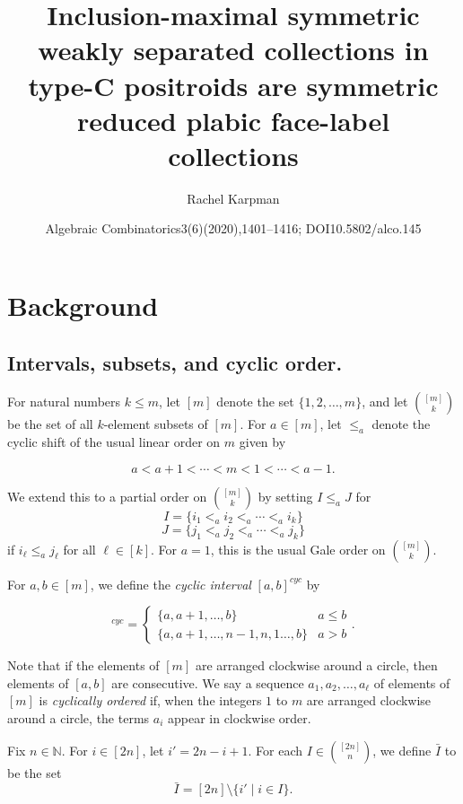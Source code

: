 \documentclass[10pt]{amsart}
\title[Symmetric weak separation and plabic face labels]{Inclusion-maximal symmetric weakly separated collections in type-C positroids are symmetric reduced plabic face-label collections}
\author{Rachel Karpman}
\date{Algebraic Combinatorics3(6)(2020),1401–1416; DOI10.5802/alco.145}
\theoremstyle{definition}
\begin{document}
\maketitle
\setcounter{section}{1}
\section{Background}
\label{back}
\subsection{Intervals, subsets, and cyclic order.}

For natural numbers $k \leq m$, let $[m]$ denote the set $\{1,2,\ldots,m\}$, and let $\binom{[m]}{k}$ be the set of all $k$-element subsets of $[m]$. For $a \in [m]$, let $\leq_a$ denote the cyclic shift of the usual linear order on $m$ given by 
 
\begin{equation}
	a < a + 1 < \cdots < m < 1 < \cdots < a-1.
\end{equation}

We extend this to a partial order on $\binom{[m]}{k}$ by setting $I \leq_a J$ for
\[I = \{i_1 <_a i_2 <_a \cdots <_a i_k\}\]
\[J = \{j_1 <_a j_2 <_a \cdots <_a j_k\}\]
if $i_{\ell} \leq_a j_{\ell}$ for all $\ell \in [k]$.
For $a = 1$, this is the usual Gale order on $\binom{[m]}{k}$.
 
For $a,b \in [m]$, we define the \emph{cyclic interval} $[a,b]^{cyc}$ by

\begin{equation}
	[a,b]^{cyc} = \begin{cases}
	\{a,a+1,\ldots,b\} & a \leq b\\
	\{a,a+1,\ldots,n-1,n,1 \ldots,b\} & a > b
	\end{cases}.
\end{equation} 

Note that if the elements of $[m]$ are arranged clockwise around a circle, then elements of $[a,b]$ are consecutive. We say a sequence $a_1,a_2,\ldots,a_{\ell}$ of elements of $[m]$ is \emph{cyclically ordered} if, when the integers $1$ to $m$ are arranged clockwise around a circle, the terms $a_i$ appear in clockwise order.

Fix $n \in \mathbb{N}$. For $i \in [2n]$, let $i' = 2n - i + 1$. For each $I \in \binom{[2n]}{n}$, we define $\bar{I}$ to be the set 
\begin{equation}
	\bar{I} = [2n] \setminus \{i' \mid i \in I\}.
\end{equation} 
\end{document}
